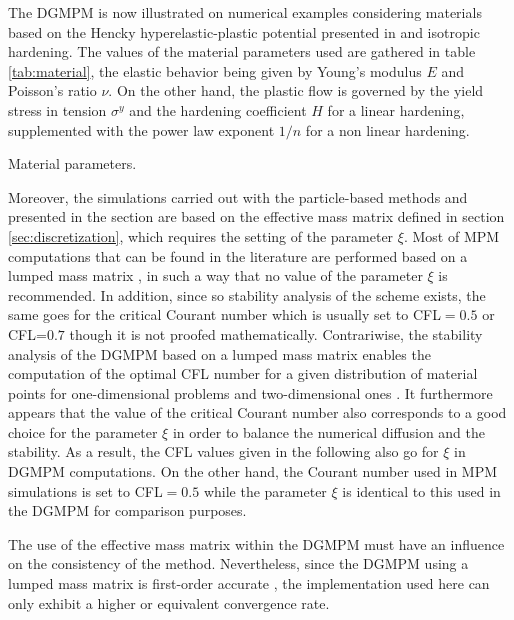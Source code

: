 The DGMPM is now illustrated on numerical examples considering materials based on the Hencky hyperelastic-plastic potential presented in \cite{Laurent2009} and isotropic hardening. 
The values of the material parameters used are gathered in table \ref{tab:material}, the elastic behavior being given by Young's modulus $E$ and Poisson's ratio $\nu$. 
On the other hand, the plastic flow is governed by the yield stress in tension $\sigma^y$ and the hardening coefficient $H$ for a linear hardening, supplemented with the power law exponent $1/n$ for a non linear hardening.
\begin{table}[h!]
  \centering
  
  \caption{Material parameters.}
  \label{tab:material}
\end{table}

Moreover, the simulations carried out with the particle-based methods and presented in the section are based on the effective mass matrix defined in section \ref{sec:discretization}, which requires the setting of the parameter $\xi$.
Most of MPM computations that can be found in the literature are performed based on a lumped mass matrix \cite{Book_MPM,MPM_PIC_FLIP,MPM_cutting,BC_MPM}, in such a way that no value of the parameter $\xi$ is recommended.
In addition, since so stability analysis of the scheme exists, the same goes for the critical Courant number which is usually set to CFL$=0.5$ or CFL=$0.7$ though it is not proofed mathematically.
Contrariwise, the stability analysis of the DGMPM based on a lumped mass matrix enables the computation of the optimal CFL number for a given distribution of material points for one-dimensional problems \cite{DGMPM} and two-dimensional ones \cite{DGMPM_stab}.
It furthermore appears that the value of the critical Courant number also corresponds to a good choice for the parameter $\xi$ in order to balance the numerical diffusion and the stability.
As a result, the CFL values given in the following also go for $\xi$ in DGMPM computations.
On the other hand, the Courant number used in MPM simulations is set to CFL$=0.5$ while the parameter $\xi$ is identical to this used in the DGMPM for comparison purposes. 

\begin{remark}
  The use of the effective mass matrix within the DGMPM must have an influence on the consistency of the method.
  Nevertheless, since the DGMPM using a lumped mass matrix is first-order accurate \cite{Thesis}, the implementation used here can only exhibit a higher or equivalent convergence rate.
\end{remark}

